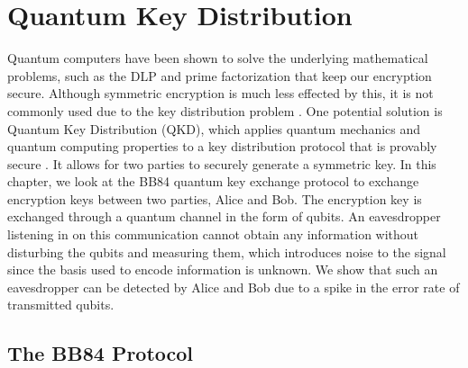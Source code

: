 \chapter{Quantum Key Distribution}
\label{chap:bb84}

Quantum computers have been shown to solve the underlying mathematical problems, such as the DLP and prime factorization that keep our encryption secure.
Although symmetric encryption is much less effected by this, it is not commonly used due to the key distribution problem \cite{cryptography}.
One potential solution is Quantum Key Distribution (QKD), which applies quantum mechanics and quantum computing properties to a key distribution protocol that is provably secure \cite{MikeAndIke}.
It allows for two parties to securely generate a symmetric key.
In this chapter, we look at the BB84 quantum key exchange protocol to exchange encryption keys between two parties, Alice and Bob.
The encryption key is exchanged through a quantum channel in the form of qubits.
An eavesdropper listening in on this communication cannot obtain any information without disturbing the qubits and measuring them, which introduces noise to the signal since the basis used to encode information is unknown. 
We show that such an eavesdropper can be detected by Alice and Bob due to a spike in the error rate of transmitted qubits.

\section{The BB84 Protocol}


